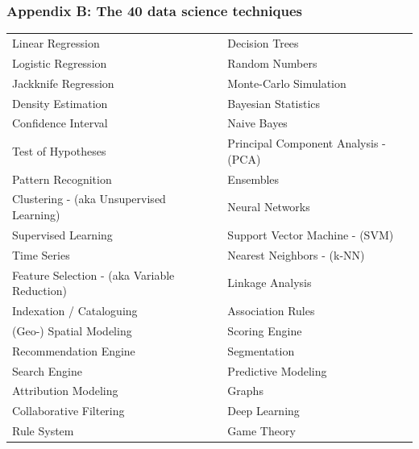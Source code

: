 \documentclass[a4paper, 11pt,twoside=true]{scrartcl}
\begin{document}
\subsubsection*{Appendix B: The 40 data science techniques}
\begin{table}[h]
	\begin{tabular}{ll}
		Linear Regression                            & Decision Trees                       \\
		Logistic Regression                          & Random Numbers                       \\
		Jackknife Regression                         & Monte-Carlo Simulation               \\
		Density Estimation                           & Bayesian Statistics                  \\
		Confidence Interval                          & Naive Bayes                          \\
		Test of Hypotheses                           & Principal Component Analysis - (PCA) \\
		Pattern Recognition                          & Ensembles                            \\
		Clustering - (aka Unsupervised Learning)     & Neural Networks                      \\
		Supervised Learning                          & Support Vector Machine - (SVM)       \\
		Time Series                                  & Nearest Neighbors - (k-NN)           \\
		Feature Selection - (aka Variable Reduction) & Linkage Analysis                     \\
		Indexation / Cataloguing                     & Association Rules                    \\
		(Geo-) Spatial Modeling                      & Scoring Engine                       \\
		Recommendation Engine                        & Segmentation                         \\
		Search Engine                                & Predictive Modeling                  \\
		Attribution Modeling                         & Graphs                               \\
		Collaborative Filtering                      & Deep Learning                        \\
		Rule System                                  & Game Theory                          \\

\end{tabular}
\end{table}
\end{document}
